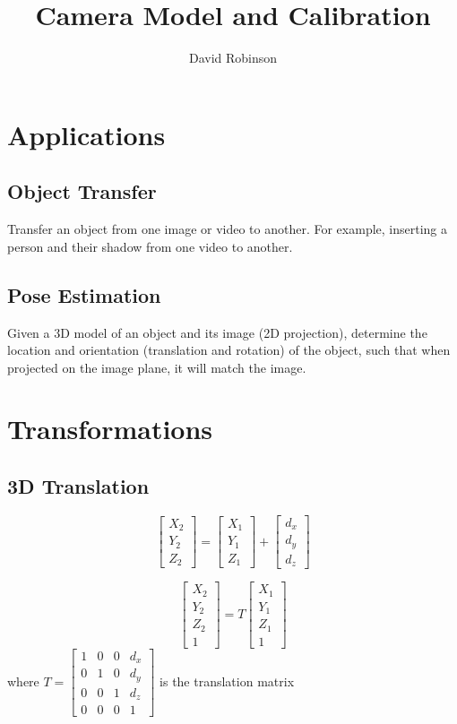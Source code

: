 \documentclass{article}
\title{Camera Model and Calibration}
\author{David Robinson}
\date{}
\begin{document}
\maketitle

\section*{Applications}
\subsection*{Object Transfer}
Transfer an object from one image or video to another. For example, inserting a person and their shadow from one video to another.

\subsection*{Pose Estimation}
Given a 3D model of an object and its image (2D projection), determine the location and orientation (translation and rotation) of the object, such that when projected on the image plane, it will match the image.

\section*{Transformations}
\subsection*{3D Translation}
\[\begin{bmatrix}
    X_2 \\ Y_2 \\ Z_2
\end{bmatrix} = \begin{bmatrix}
    X_1 \\ Y_1 \\ Z_1
\end{bmatrix} + \begin{bmatrix}
    d_x \\ d_y \\ d_z
\end{bmatrix}\]

\[\begin{bmatrix}
    X_2 \\ Y_2 \\ Z_2 \\ 1
\end{bmatrix} = T \begin{bmatrix}
    X_1 \\ Y_1 \\ Z_1 \\ 1
\end{bmatrix}\] where $T=\begin{bmatrix}
    1 & 0 & 0 & d_x \\
    0 & 1 & 0 & d_y \\
    0 & 0 & 1 & d_z \\
    0 & 0 & 0 & 1
\end{bmatrix}$ is the translation matrix
\end{document}

